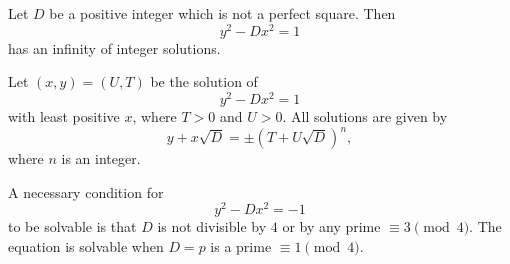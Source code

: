 \begin{proposition}
    Let $D$ be a positive integer which is not a perfect square. Then
\[
    y^2-Dx^2=1
\]
    has an infinity of integer solutions.
\end{proposition}

\begin{proposition}
Let $(x,y)=(U,T)$ be the solution of
\[
    y^2-Dx^2=1
\]
with least positive $x$, where $T>0$ and $U>0$. All solutions are given by
\[
    y+x\sqrt{D}=\pm(T+U\sqrt{D})^n,
\]
where $n$ is an integer.
\end{proposition}

\begin{proposition}
A necessary condition for
\[
    y^2-Dx^2=-1
\]
to be solvable is that $D$ is not divisible by $4$ or by any prime
$\equiv3\pmod4$. The equation is solvable when $D=p$ is a prime
$\equiv1\pmod4$.
\end{proposition}
